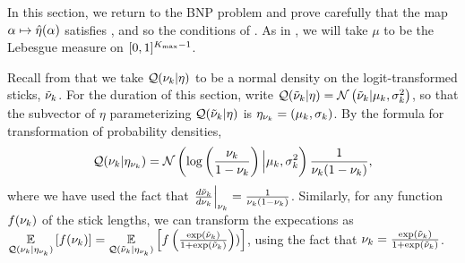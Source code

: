 In this section, we return to the BNP problem and prove carefully that the map
$\alpha \mapsto \hat\eta(\alpha)$ satisfies ,
and so the conditions of .  As in ,
we will take $\mu$ to be the Lebesgue measure on $[0,1]^{{K_{\mathrm{max}}} - 1}$.

Recall from  that we take $\mathcal{Q}(\nu_{k} \vert \eta)$ to be a normal
density on the logit-transformed sticks, $\tilde{\nu}_k$.  For the duration of
this section, write $\mathcal{Q}(\tilde{\nu}_{k} \vert \eta) = \mathcal{N}\left(\tilde{\nu}_{k} \vert \mu_k,
\sigma^2_k\right)$, so that the subvector of $\eta$ parameterizing $\mathcal{Q}(\tilde{\nu}_{k} \vert
\eta)$ is $\eta_{\nu_{k}} = (\mu_k, \sigma_k)$.
%
By the formula for transformation of probability densities,
%
\begin{align*}
%
\q(\nuk \vert \etanuk) =
    \normdist{\log\left(\frac{\nu_\k}{1 - \nu_\k} \right)
        \Big\vert  \mu_\k, \sigma^2_\k}
    \frac{1}{\nuk (1 - \nuk)},
%
\end{align*}
%
where we have used the fact that $\left.\frac{d \tilde{\nu}_k}{ d\nu_{k}}\right\vert_{\nu_{k}} =
\frac{1}{\nu_{k} (1 - \nu_{k})}$.  Similarly, for any function $f(\nu_{k})$ of the stick
lengths, we can transform the expecations as $\underset{\mathcal{Q}(\nu_{k} \vert
\eta_{\nu_{k}})}{\mathbb{E}}\left[f(\nu_{k})\right] = \underset{\mathcal{Q}(\tilde{\nu}_{k} \vert \eta_{\nu_{k}})}{\mathbb{E}}\left[f\left(
\frac{\exp(\tilde{\nu}_{k})}{1 + \exp(\tilde{\nu}_{k})}  \right))\right]$, using the fact that
$\nu_{k} = \frac{\exp(\tilde{\nu}_{k})}{1 + \exp(\tilde{\nu}_{k})}$.

